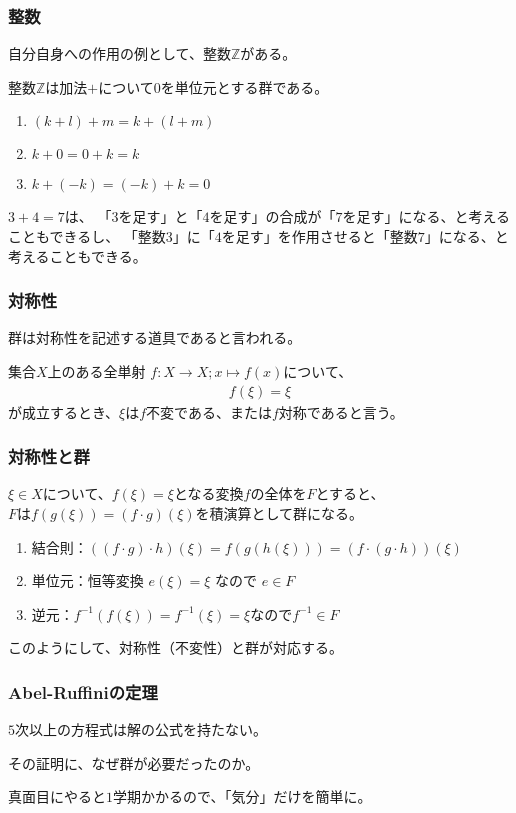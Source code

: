 \documentclass[12pt, t]{beamer}
\begin{document}
\begin{frame}
\frametitle{整数}
自分自身への作用の例として、整数$\mathbb{Z}$がある。

整数$\mathbb{Z}$は加法$+$について$0$を単位元とする群である。
\begin{enumerate}
\item $(k + l) + m = k + (l + m)$
\item $k + 0 = 0 + k = k$
\item $k + (-k) = (-k) + k = 0$
\end{enumerate}

$3 + 4 = 7$は、
「$3$を足す」と「$4$を足す」の合成が「$7$を足す」になる、と考えることもできるし、
「整数$3$」に「$4$を足す」を作用させると「整数$7$」になる、と考えることもできる。
\end{frame}

\begin{frame}
\frametitle{対称性}
群は対称性を記述する道具であると言われる。

集合$X$上のある全単射 $f: X \rightarrow X; x \mapsto f(x)$について、
\begin{align}
  f(\xi) = \xi
\end{align}
が成立するとき、$\xi$は\alert{$f$不変である}、または\alert{$f$対称である}と言う。
\end{frame}

\begin{frame}
\frametitle{対称性と群}
$\xi \in X$について、$f(\xi) = \xi$となる変換$f$の全体を$F$とすると、\\
$F$は$f(g(\xi)) = (f \cdot g)(\xi)$を積演算として群になる。

\begin{enumerate}
\item 結合則：$((f \cdot g) \cdot h)(\xi) = f(g(h(\xi))) = (f \cdot (g \cdot h))(\xi)$
\item 単位元：恒等変換 $e(\xi) = \xi$ なので $e \in F$
\item 逆元：$f^{-1}(f(\xi)) = f^{-1}(\xi) = \xi$なので$f^{-1} \in F$
\end{enumerate}

このようにして、対称性（不変性）と群が対応する。
\end{frame}


\begin{frame}
\frametitle{Abel-Ruffiniの定理}
$5$次以上の方程式は解の公式を持たない。

その証明に、なぜ群が必要だったのか。

真面目にやると$1$学期かかるので、「気分」だけを簡単に。
\nocite{lemniscus2011}
\end{frame}
\end{document}
